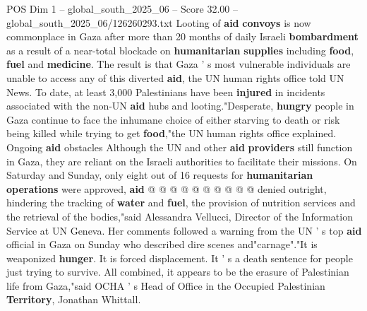 \begin{textsample}{POS Dim 1 – global\_south\_2025\_06 – Score 32.00 – global\_south\_2025\_06/126260293.txt}
Looting of \textbf{aid} \textbf{convoys} is now commonplace in Gaza after more than 20 months of daily Israeli \textbf{bombardment} as a result of a near-total blockade on \textbf{humanitarian} \textbf{supplies} including \textbf{food}, \textbf{fuel} and \textbf{medicine}.
The result is that Gaza ' s most vulnerable individuals are unable to access any of this diverted \textbf{aid}, the UN human rights office told UN News.
To date, at least 3,000 Palestinians have been \textbf{injured} in incidents associated with the non-UN \textbf{aid} hubs and looting."Desperate, \textbf{hungry} people in Gaza continue to face the inhumane choice of either starving to death or risk being killed while trying to get \textbf{food},"the UN human rights office explained.
Ongoing \textbf{aid} obstacles Although the UN and other \textbf{aid} \textbf{providers} still function in Gaza, they are reliant on the Israeli authorities to facilitate their missions.
On Saturday and Sunday, only eight out of 16 requests for \textbf{humanitarian} \textbf{operations} were approved, \textbf{aid} @ @ @ @ @ @ @ @ @ @ denied outright, hindering the tracking of \textbf{water} and \textbf{fuel}, the provision of nutrition services and the retrieval of the bodies,"said Alessandra Vellucci, Director of the Information Service at UN Geneva.
Her comments followed a warning from the UN ' s top \textbf{aid} official in Gaza on Sunday who described dire scenes and"carnage"."It is weaponized \textbf{hunger}.
It is forced displacement.
It ' s a death sentence for people just trying to survive.
All combined, it appears to be the erasure of Palestinian life from Gaza,"said OCHA ' s Head of Office in the Occupied Palestinian \textbf{Territory}, Jonathan Whittall.

\end{textsample}
